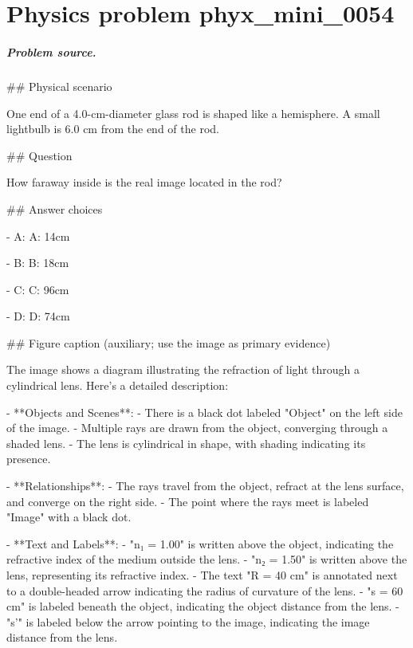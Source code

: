 
\chapter{Physics problem phyx\_mini\_0054}
\label{ch:PhyXMiniProblems_problem_phyx_mini_0054}

\paragraph{Problem source.}
\#\# Physical scenario

One end of a 4.0-cm-diameter glass rod is shaped like a hemisphere. A small lightbulb is 6.0 cm from the end of the rod.

\#\# Question

How faraway inside is the real image located in the rod?

\#\# Answer choices

- A: A: 14cm

- B: B: 18cm

- C: C: 96cm

- D: D: 74cm

\#\# Figure caption (auxiliary; use the image as primary evidence)

The image shows a diagram illustrating the refraction of light through a cylindrical lens. Here's a detailed description:

- **Objects and Scenes**:
  - There is a black dot labeled "Object" on the left side of the image.
  - Multiple rays are drawn from the object, converging through a shaded lens.
  - The lens is cylindrical in shape, with shading indicating its presence.

- **Relationships**:
  - The rays travel from the object, refract at the lens surface, and converge on the right side.
  - The point where the rays meet is labeled "Image" with a black dot.

- **Text and Labels**:
  - "n₁ = 1.00" is written above the object, indicating the refractive index of the medium outside the lens.
  - "n₂ = 1.50" is written above the lens, representing its refractive index.
  - The text "R = 40 cm" is annotated next to a double-headed arrow indicating the radius of curvature of the lens.
  - "s = 60 cm" is labeled beneath the object, indicating the object distance from the lens.
  - "s'" is labeled below the arrow pointing to the image, indicating the image distance from the lens.

